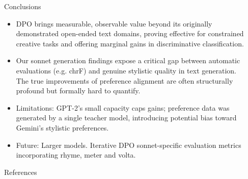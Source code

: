 \documentclass[final]{beamer}
\newlength{\sepwidth}
\newlength{\colwidth}
\newcommand{\separatorcolumn}{\begin{column}{\sepwidth}\end{column}}
\begin{document}
\begin{frame}[t]
\begin{columns}[t]
\begin{column}{\colwidth}
\begin{block}{Conclusions}
    \begin{itemize}
      \item DPO brings measurable, observable value beyond its originally demonstrated open-ended text domains, proving effective for constrained creative tasks and offering marginal gains in discriminative classification.
      \item Our sonnet generation findings expose a critical gap between automatic evaluations (e.g. chrF) and genuine stylistic quality in text generation. The true improvements of preference alignment are often structurally profound but formally hard to quantify.
      \item Limitations: GPT-2's small capacity caps gains; preference data was generated by a single teacher model, introducing potential
bias toward Gemini's stylistic preferences.
      \item Future: Larger models. Iterative DPO sonnet-specific evaluation metrics incorporating rhyme, meter and volta.
    \end{itemize}

  \end{block}

  \begin{block}{References}

    \nocite{*}
    {\footnotesize }

  \end{block}

\end{column}

\separatorcolumn
\end{columns}
\end{frame}
\end{document}
